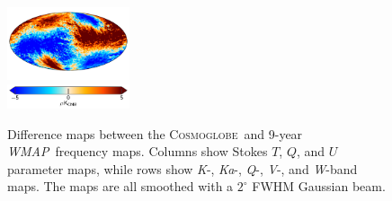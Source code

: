 \documentclass[twocolumn]{../../common/aa}
\def\WMAP{\emph{WMAP}}
\newcommand{\cosmoglobe}{\textsc{Cosmoglobe}}
\newcommand{\K}[0]{\textit K}
\newcommand{\Ka}[0]{\textit{Ka}}
\newcommand{\Q}[0]{\textit Q}
\newcommand{\V}[0]{\textit V}
\newcommand{\W}[0]{\textit W}
\begin{document}
\begin{figure}
        \includegraphics[width=0.32\textwidth]{figures/megadiff_W_U.pdf}\\\vspace*{-4mm}
	\includegraphics[width=0.32\textwidth]{figures/cbar_5uK_cmb.pdf}
	\caption{Difference maps between the \cosmoglobe\ and 9-year \WMAP\ frequency maps. Columns show Stokes $T$, $Q$, and $U$ parameter maps, while rows show \K-, \Ka-, \Q-, \V-, and \W-band maps. The maps are all smoothed with a $2^\circ$ FWHM Gaussian beam.}
        \label{fig:megadiff_wmap}
\end{figure}
\end{document}
